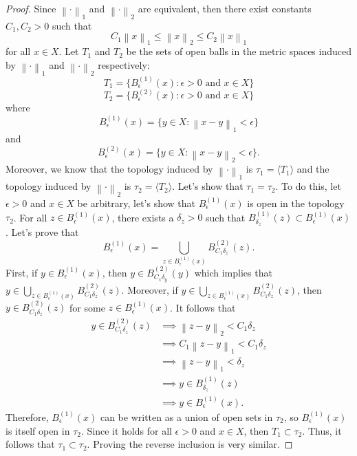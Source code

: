\documentclass{article}
\newcommand{\lnorm}[2]{\left\lVert#2 \right\rVert_{#1}}
\begin{document}
\begin{proof}
    Since $\lnorm{1}{\cdot}$ and $\lnorm{2}{\cdot}$ are equivalent, then there exist constants $C_1, C_2 > 0$ such that
    $$C_1 \lnorm{1}{x} \leq \lnorm{2}{x} \leq C_2 \lnorm{1}{x}$$
    for all $x \in X$. Let $T_1$ and $T_2$ be the sets of open balls in the metric spaces induced by $\lnorm{1}{\cdot}$ and $\lnorm{2}{\cdot}$ respectively:
    $$T_1 = \{B_{\epsilon}^{(1)}(x) : \epsilon > 0 \text{ and } x\in X\}$$
    $$T_2 = \{B_{\epsilon}^{(2)}(x) : \epsilon > 0 \text{ and } x\in X\}$$
    where 
    $$B_{\epsilon}^{(1)}(x) = \{y \in X : \lnorm{1}{x - y} < \epsilon\}$$
    and 
    $$B_{\epsilon}^{(2)}(x) = \{y \in X : \lnorm{2}{x - y} < \epsilon\}.$$
    Moreover, we know that the topology induced by $\lnorm{1}{\cdot}$ is $\tau_1 = \langle T_1 \rangle$ and the topology induced by $\lnorm{2}{\cdot}$ is $\tau_2 = \langle T_2 \rangle$. Let's show that $\tau_1 = \tau_2$. To do this, let $\epsilon > 0$ and $x \in X$ be arbitrary, let's show that $B_{\epsilon}^{(1)}(x)$ is open in the topology $\tau_2$. For all $z \in B_{\epsilon}^{(1)}(x)$, there exists a $\delta_z > 0$ such that $B_{\delta_z}^{(1)}(z) \subset B_{\epsilon}^{(1)}(x)$. Let's prove that
    $$B_{\epsilon}^{(1)}(x) = \bigcup_{z \in  B_{\epsilon}^{(1)}(x)}B_{C_1\delta_z}^{(2)}(z).$$
    First, if $y \in B_{\epsilon}^{(1)}(x)$, then $y \in B_{C_1\delta_y}^{(2)}(y)$ which implies that $y \in \bigcup_{z \in  B_{\epsilon}^{(1)}(x)}B_{C_1\delta_z}^{(2)}(z)$. Moreover, if $y \in \bigcup_{z \in  B_{\epsilon}^{(1)}(x)}B_{C_1\delta_z}^{(2)}(z)$, then $y \in B_{C_1\delta_z}^{(2)}(z)$ for some $z \in B_{\epsilon}^{(1)}(x)$. It follows that
    \begin{align*}
        y \in B_{C_1\delta_z}^{(2)}(z) &\implies \lnorm{2}{z - y} < C_1 \delta_z \\
        &\implies C_1 \lnorm{1}{z - y} < C_1 \delta_z \\
        &\implies \lnorm{1}{z - y} < \delta_z \\
        &\implies y \in B_{\delta_z}^{(1)}(z) \\
        &\implies y \in B_{\epsilon}^{(1)}(x). 
    \end{align*}
    Therefore, $B_{\epsilon}^{(1)}(x)$ can be written as a union of open sets in $\tau_2$, so $B_{\epsilon}^{(1)}(x)$ is itself open in $\tau_2$. Since it holds for all $\epsilon > 0$ and $x \in X$, then $T_1 \subset \tau_2$. Thus, it follows that $\tau_1 \subset \tau_2$. Proving the reverse inclusion is very similar.
\end{proof}
\end{document}
